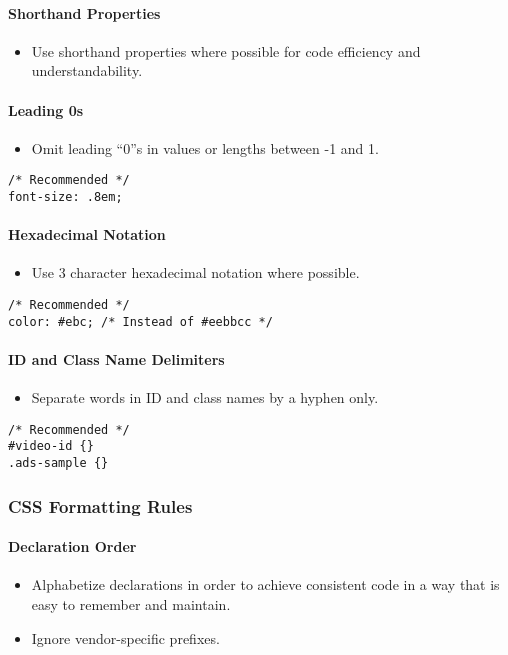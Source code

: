 \documentclass[a4paper, 11pt]{article}
\begin{document}
\paragraph{Shorthand Properties}
\begin{itemize}
\item Use shorthand properties where possible for code efficiency and understandability.
\end{itemize}

\paragraph{Leading 0s}
\begin{itemize}
\item Omit leading “0”s in values or lengths between -1 and 1.
\end{itemize}
\begin{verbatim}
/* Recommended */
font-size: .8em;
\end{verbatim}

\paragraph{Hexadecimal Notation}
\begin{itemize}
\item Use 3 character hexadecimal notation where possible.
\end{itemize}
\begin{verbatim}
/* Recommended */
color: #ebc; /* Instead of #eebbcc */
\end{verbatim}

\paragraph{ID and Class Name Delimiters}
\begin{itemize}
\item Separate words in ID and class names by a hyphen only.
\end{itemize}
\begin{verbatim}
/* Recommended */
#video-id {}
.ads-sample {}
\end{verbatim}

\subsubsection{CSS Formatting Rules}

\paragraph{Declaration Order}
\begin{itemize}
\item Alphabetize declarations in order to achieve consistent code in a way that is easy to remember and maintain.
\item Ignore vendor-specific prefixes.
\end{itemize}
\end{document}
